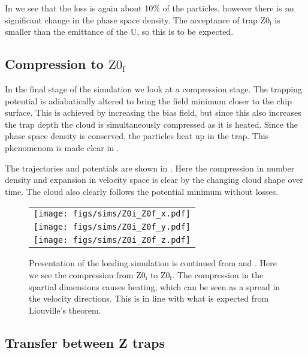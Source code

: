 In  we see that the loss is again about 10\% of
the particles, however there is no significant change in the phase space
density. The acceptance of trap $\mathrm{Z0_i}$ is smaller than the emittance
of the U, so this is to be expected.

\subsection{Compression to $\mathrm{Z0_f}$}

In the final stage of the simulation we look at a compression stage. The
trapping potential is adiabatically altered to bring the field minimum closer
to the chip surface. This is achieved by increasing the bias field, but since
this also increases the trap depth the cloud is simultaneously compressed as it
is heated. Since the phase space density is conserved, the particles heat up in
the trap. This phenomenom is made clear in .

The trajectories and potentials are shown in .
Here the compression in number density and expansion in velocity space is clear
by the changing cloud shape over time. The cloud also clearly follows the
potential minimum without losses.

\begin{figure}[p]
\centering
  \begin{tabular}{c}
    \texttt{[image: figs/sims/Z0i\_Z0f\_x.pdf]} \\
    \texttt{[image: figs/sims/Z0i\_Z0f\_y.pdf]} \\
    \texttt{[image: figs/sims/Z0i\_Z0f\_z.pdf]}
  \end{tabular}
  \caption{Presentation of the loading simulation is continued from
   and . Here we see
  the compression from $\mathrm{Z0_i}$ to $\mathrm{Z0_f}$. The compression in
  the spartial dimensions causes heating, which can be seen as a spread in the
  velocity directions. This is in line with what is expected from Liouville's
  theorem.
  }
  \label{design:fig:Z0i_Z0f}
\end{figure}

\subsection{Transfer between Z traps}
\label{design:transferbetweenzs}

